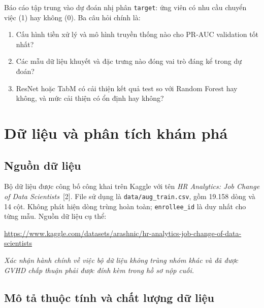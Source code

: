 \documentclass[12pt,a4paper,oneside]{report}
\newcommand{\code}[1]{\texttt{#1}}
\begin{document}
Báo cáo tập trung vào dự đoán nhị phân \code{target}: ứng viên có nhu cầu chuyển việc (1) hay không (0). Ba câu hỏi chính là:

\begin{enumerate}
  \item Cấu hình tiền xử lý và mô hình truyền thống nào cho PR-AUC validation tốt nhất?
  \item Các mẫu dữ liệu khuyết và đặc trưng nào đóng vai trò đáng kể trong dự đoán?
  \item ResNet hoặc TabM có cải thiện kết quả test so với Random Forest hay không, và mức cải thiện có ổn định hay không?
\end{enumerate}

\chapter{Dữ liệu và phân tích khám phá}

\section{Nguồn dữ liệu}

Bộ dữ liệu được công bố công khai trên Kaggle với tên \textit{HR Analytics: Job Change of Data Scientists}~[2]. File sử dụng là \code{data/aug\_train.csv}, gồm 19.158 dòng và 14 cột. Không phát hiện dòng trùng hoàn toàn; \code{enrollee\_id} là duy nhất cho từng mẫu. Nguồn dữ liệu cụ thể:

\begin{center}
\url{https://www.kaggle.com/datasets/arashnic/hr-analytics-job-change-of-data-scientists}
\end{center}

\noindent\textit{Xác nhận hành chính về việc bộ dữ liệu không trùng nhóm khác và đã được GVHD chấp thuận phải được đính kèm trong hồ sơ nộp cuối.}

\section{Mô tả thuộc tính và chất lượng dữ liệu}
\end{document}
